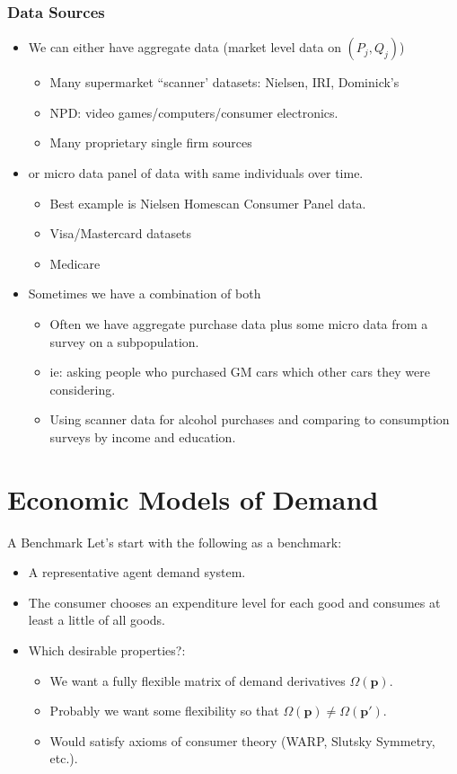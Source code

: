 \documentclass[xcolor=pdftex,dvipsnames,table,mathserif,aspectratio=169]{beamer}
\begin{document}
\begin{frame}
\frametitle{Data Sources}
\begin{itemize}
\item We can either have \alert{aggregate data} (market level data on $(P_j,Q_j)$)
\begin{itemize}
\item Many supermarket ``scanner' datasets: Nielsen, IRI, Dominick's
\item NPD: video games/computers/consumer electronics.
\item Many proprietary single firm sources
\end{itemize}
\item or \alert{micro data} panel of data with same individuals over time.
\begin{itemize}
\item Best example is Nielsen Homescan Consumer Panel data.
\item Visa/Mastercard datasets
\item Medicare
\end{itemize}
\item Sometimes we have a combination of both
\begin{itemize}
\item Often we have aggregate purchase data plus some \alert{micro data} from a survey on a subpopulation.
\item ie: asking people who purchased GM cars which other cars they were considering.
\item Using scanner data for alcohol purchases and comparing to consumption surveys by income and education.
\end{itemize}
\end{itemize}
\end{frame}


\section{Economic Models of Demand}
\begin{frame}{A Benchmark}
Let's start with the following as a benchmark:
\begin{itemize}
\item A \alert{representative agent} demand system. 
\item The consumer chooses an \alert{expenditure} level for each good and consumes at least a little of all goods.
\item Which desirable properties?:
\begin{itemize}
\item We want a fully flexible matrix of demand derivatives $\Omega(\mathbf{p})$.
\item Probably we want some flexibility so that $\Omega(\mathbf{p}) \neq \Omega(\mathbf{p'})$.
\item Would satisfy axioms of consumer theory (WARP, Slutsky Symmetry, etc.).
\end{itemize}
\end{itemize}
\end{frame}
\end{document}
